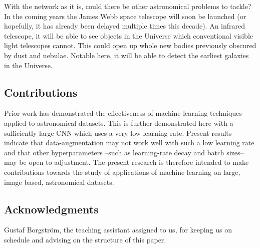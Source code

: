 With the network as it is, could there be other astronomical problems to tackle? In the coming years the James Webb space telescope will soon be launched (or hopefully, it has already been delayed multiple times this decade). An infrared telescope, it will be able to see objects in the Universe which conventional visible light telescopes cannot. This could open up whole new bodies previously obscured by dust and nebulae. Notable here, it will be able to detect the earliest galaxies in the Universe.


\subsection{Contributions}
Prior work has demonstrated the effectiveness of machine learning techniques applied to astronomical datasets. This is further demonstrated here with a sufficiently large CNN which uses a very low learning rate. Present results indicate that data-augmentation may not work well with such a low learning rate and that other hyperparameters --such as learning-rate decay and batch sizes-- may be open to adjustment. The present research is therefore intended to make contributions towards the study of applications of machine learning on large, image based, astronomical datasets.


\subsection{Acknowledgments}

Gustaf Borgström, the teaching assistant assigned to us, for keeping us on schedule and advising on the structure of this paper.
